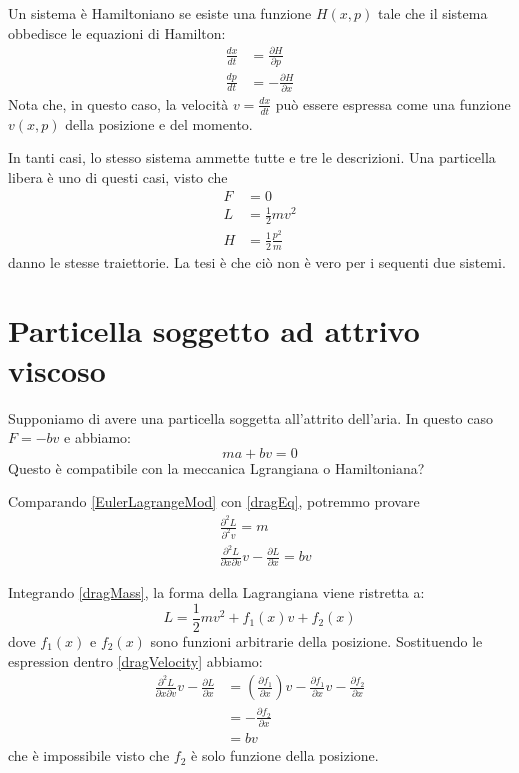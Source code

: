 \documentclass[11pt]{article}
\begin{document}
Un sistema \`e Hamiltoniano se esiste una funzione $H(x,p)$ tale che il sistema obbedisce le equazioni di Hamilton:
\begin{equation}
\begin{aligned}
\frac{dx}{dt} &= \frac{\partial H}{\partial p} \\
\frac{dp}{dt} &= - \frac{\partial H}{\partial x}
\end{aligned}
\label{Hamilton}
\end{equation}
Nota che, in questo caso, la velocit\`a $v=\frac{dx}{dt}$ pu\`o essere espressa come una funzione $v(x,p)$ della posizione e del momento.

In tanti casi, lo stesso sistema ammette tutte e tre le descrizioni. Una particella libera \`e uno di questi casi, visto che
\begin{equation}
\begin{aligned}
F&=0 \\
L&=\frac{1}{2}mv^2 \\
H&=\frac{1}{2}\frac{p^2}{m}
\end{aligned}
\end{equation}
danno le stesse traiettorie. La tesi \`e che ci\`o non \`e vero per i sequenti due sistemi.

\section{Particella soggetto ad attrivo viscoso}

Supponiamo di avere una particella soggetta all'attrito dell'aria. In questo caso $F=-bv$ e abbiamo:
\begin{equation}
\label{dragEq}
ma+bv=0
\end{equation}
Questo \`e compatibile con la meccanica Lgrangiana o Hamiltoniana?

Comparando \eqref{EulerLagrangeMod} con \eqref{dragEq}, potremmo provare
\begin{align}
	\label{dragMass}
	&\frac{\partial^2 L}{\partial^2 v} = m \\
	\label{dragVelocity}
	&\frac{\partial^2 L}{\partial x \partial v} v - \frac{\partial L}{\partial x} = bv
\end{align}

Integrando \eqref{dragMass}, la forma della Lagrangiana viene ristretta a:
\begin{equation*}
	L = \frac{1}{2} m v^2 + f_1(x) v + f_2 (x)
\end{equation*}
dove $f_1(x)$ e $f_2 (x)$ sono funzioni arbitrarie della posizione. Sostituendo le espression dentro \eqref{dragVelocity} abbiamo:
\begin{align*}
	\frac{\partial^2 L}{\partial x \partial v} v - \frac{\partial L}{\partial x} &= \left(\frac{\partial f_1}{\partial x}\right) v - \frac{\partial f_1}{\partial x} v -  \frac{\partial f_2}{\partial x} \\
	&= -  \frac{\partial f_2}{\partial x} \\
	&= bv
\end{align*}
che \`e impossibile visto che $f_2$ \`e solo funzione della posizione.
\end{document}
